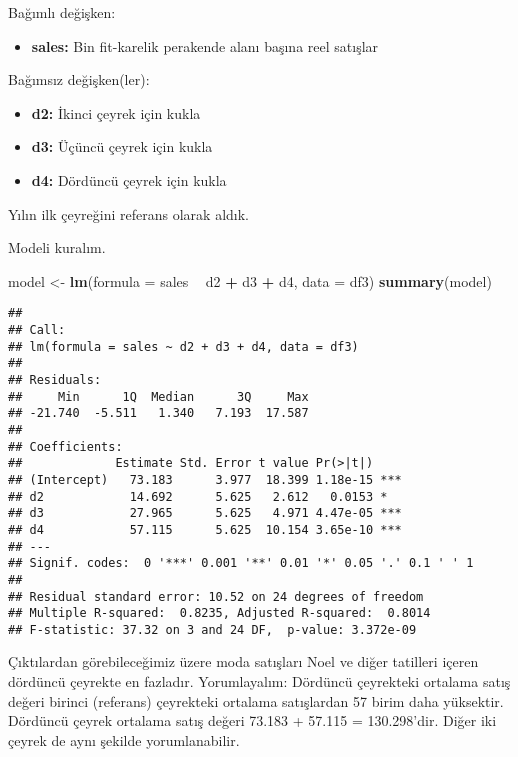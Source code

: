 \documentclass[
]{book}
\newenvironment{Shaded}{\begin{snugshade}}{\end{snugshade}}
\newcommand{\DataTypeTok}[1]{\textcolor[rgb]{0.13,0.29,0.53}{#1}}
\newcommand{\KeywordTok}[1]{\textcolor[rgb]{0.13,0.29,0.53}{\textbf{#1}}}
\newcommand{\NormalTok}[1]{#1}
\newcommand{\OperatorTok}[1]{\textcolor[rgb]{0.81,0.36,0.00}{\textbf{#1}}}
\newcommand{\StringTok}[1]{\textcolor[rgb]{0.31,0.60,0.02}{#1}}
\providecommand{\tightlist}{%
  \setlength{\itemsep}{0pt}\setlength{\parskip}{0pt}}
\begin{document}
Bağımlı değişken:

\begin{itemize}
\tightlist
\item
  \textbf{sales:} Bin fit-karelik perakende alanı başına reel satışlar
\end{itemize}

Bağımsız değişken(ler):

\begin{itemize}
\item
  \textbf{d2:} İkinci çeyrek için kukla
\item
  \textbf{d3:} Üçüncü çeyrek için kukla
\item
  \textbf{d4:} Dördüncü çeyrek için kukla
\end{itemize}

Yılın ilk çeyreğini referans olarak aldık.

Modeli kuralım.

\begin{Shaded}
\begin{Highlighting}[]
\NormalTok{model <-}\StringTok{ }\KeywordTok{lm}\NormalTok{(}\DataTypeTok{formula =}\NormalTok{ sales }\OperatorTok{~}\StringTok{ }\NormalTok{d2 }\OperatorTok{+}\StringTok{ }\NormalTok{d3 }\OperatorTok{+}\StringTok{ }\NormalTok{d4, }\DataTypeTok{data =}\NormalTok{ df3)}
\KeywordTok{summary}\NormalTok{(model)}
\end{Highlighting}
\end{Shaded}

\begin{verbatim}
## 
## Call:
## lm(formula = sales ~ d2 + d3 + d4, data = df3)
## 
## Residuals:
##     Min      1Q  Median      3Q     Max 
## -21.740  -5.511   1.340   7.193  17.587 
## 
## Coefficients:
##             Estimate Std. Error t value Pr(>|t|)    
## (Intercept)   73.183      3.977  18.399 1.18e-15 ***
## d2            14.692      5.625   2.612   0.0153 *  
## d3            27.965      5.625   4.971 4.47e-05 ***
## d4            57.115      5.625  10.154 3.65e-10 ***
## ---
## Signif. codes:  0 '***' 0.001 '**' 0.01 '*' 0.05 '.' 0.1 ' ' 1
## 
## Residual standard error: 10.52 on 24 degrees of freedom
## Multiple R-squared:  0.8235, Adjusted R-squared:  0.8014 
## F-statistic: 37.32 on 3 and 24 DF,  p-value: 3.372e-09
\end{verbatim}

Çıktılardan görebileceğimiz üzere moda satışları Noel ve diğer tatilleri içeren dördüncü çeyrekte en fazladır. Yorumlayalım: Dördüncü çeyrekteki ortalama satış değeri birinci (referans) çeyrekteki ortalama satışlardan 57 birim daha yüksektir. Dördüncü çeyrek ortalama satış değeri 73.183 + 57.115 = 130.298'dir. Diğer iki çeyrek de aynı şekilde yorumlanabilir.
\end{document}
